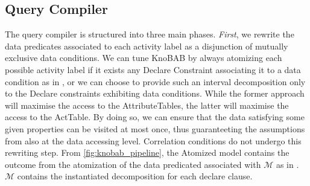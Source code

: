 \subsection{Query Compiler}\label{sec:qc}
The query compiler is structured into three main phases. \textit{First}, we rewrite the data predicates 
associated to each activity label as a 
disjunction of mutually exclusive data conditions. We can tune KnoBAB by always atomizing each possible activity label if it exists any Declare Constraint associating it to a data condition as in \cite{bpm21}, or we can choose to provide such an interval decomposition only to the Declare constraints exhibiting data conditions. While the former approach will maximise the access to the \textsf{AttributeTable}s, the latter will maximise the access to the \textsf{ActTable}. By doing so, we can ensure that the data satisfying some given properties can be visited at most once, thus guaranteeting the assumptions from \cite{BellatrecheKB21} also at the data accessing level. Correlation conditions do not undergo this rewriting step. From \figurename\ref{fig:knobab_pipeline}, the Atomized model contains the outcome from the atomization of the data predicated associated with $\mathcal{M}$ as in \cite{bpm21}. $\mathcal{M}$ contains the instantiated decomposition for each declare clause.

